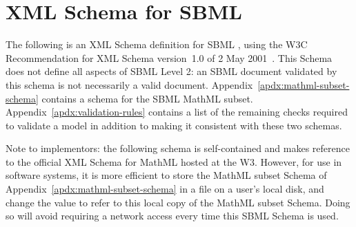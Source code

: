 
\section{XML Schema for SBML}
\label{apdx:schema}

The following is an XML Schema definition for SBML \thisLV, using
the W3C Recommendation for XML Schema version~1.0 of 2 May
2001~\citep{biron:2000,fallside:2000,thompson:2000}.  This Schema
does not define all aspects of SBML Level 2: an SBML document
validated by this schema is not necessarily a valid \sbmltwo
document.  Appendix~\ref{apdx:mathml-subset-schema} contains a
schema for the SBML MathML subset.
Appendix~\ref{apdx:validation-rules} contains a list of the
remaining checks required to validate a model in addition
to making it consistent with these two schemas.

Note to implementors: the following schema is
self-contained and makes reference to the official XML Schema for
MathML hosted at the W3.  However, for use in software systems, it
is more efficient to store the MathML subset Schema of
Appendix~\ref{apdx:mathml-subset-schema} in a file on a user's
local disk, and change the  value
 
to refer to this local copy of the MathML subset Schema.
Doing so will avoid requiring a network access every time this
SBML Schema is used.


